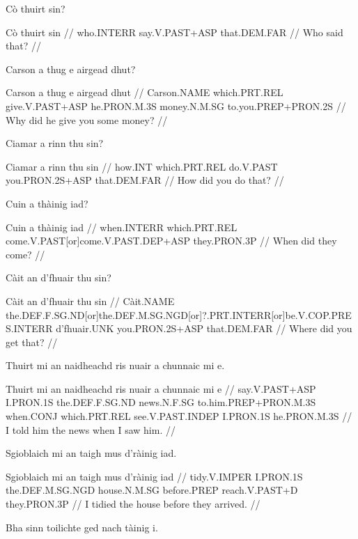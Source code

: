 \documentclass[a4paper,10pt]{article}
\begin{document}
\ex
\begingl
\glpre Cò thuirt sin? 

\vspace{4mm}
\gla Cò thuirt sin  //
\glb who.INTERR say.V.PAST+ASP that.DEM.FAR  //
\glft Who said that? //
\endgl
\xe

\ex
\begingl
\glpre Carson a thug e airgead dhut? 

\vspace{4mm}
\gla Carson a thug e airgead dhut  //
\glb Carson.NAME which.PRT.REL give.V.PAST+ASP he.PRON.M.3S money.N.M.SG to.you.PREP+PRON.2S  //
\glft Why did he give you some money? //
\endgl
\xe

\ex
\begingl
\glpre Ciamar a rinn thu sin? 

\vspace{4mm}
\gla Ciamar a rinn thu sin  //
\glb how.INT which.PRT.REL do.V.PAST you.PRON.2S+ASP that.DEM.FAR  //
\glft How did you do that? //
\endgl
\xe

\ex
\begingl
\glpre Cuin a thàinig iad? 

\vspace{4mm}
\gla Cuin a thàinig iad  //
\glb when.INTERR which.PRT.REL come.V.PAST[or]come.V.PAST.DEP+ASP they.PRON.3P  //
\glft When did they come? //
\endgl
\xe

\ex
\begingl
\glpre Càit an d'fhuair thu sin? 

\vspace{4mm}
\gla Càit an d'fhuair thu sin  //
\glb Càit.NAME the.DEF.F.SG.ND[or]the.DEF.M.SG.NGD[or]?.PRT.INTERR[or]be.V.COP.PRES.INTERR d'fhuair.UNK you.PRON.2S+ASP that.DEM.FAR  //
\glft Where did you get that? //
\endgl
\xe

\ex
\begingl
\glpre Thuirt mi an naidheachd ris nuair a chunnaic mi e. 

\vspace{4mm}
\gla Thuirt mi an naidheachd ris nuair a chunnaic mi e  //
\glb say.V.PAST+ASP I.PRON.1S the.DEF.F.SG.ND news.N.F.SG to.him.PREP+PRON.M.3S when.CONJ which.PRT.REL see.V.PAST.INDEP I.PRON.1S he.PRON.M.3S  //
\glft I told him the news when I saw him. //
\endgl
\xe

\ex
\begingl
\glpre Sgioblaich mi an taigh mus d'ràinig iad. 

\vspace{4mm}
\gla Sgioblaich mi an taigh mus d'ràinig iad  //
\glb tidy.V.IMPER I.PRON.1S the.DEF.M.SG.NGD house.N.M.SG before.PREP reach.V.PAST+D they.PRON.3P  //
\glft I tidied the house before they arrived. //
\endgl
\xe

\ex
\begingl
\glpre Bha sinn toilichte ged nach tàinig i. 
\end{document}

